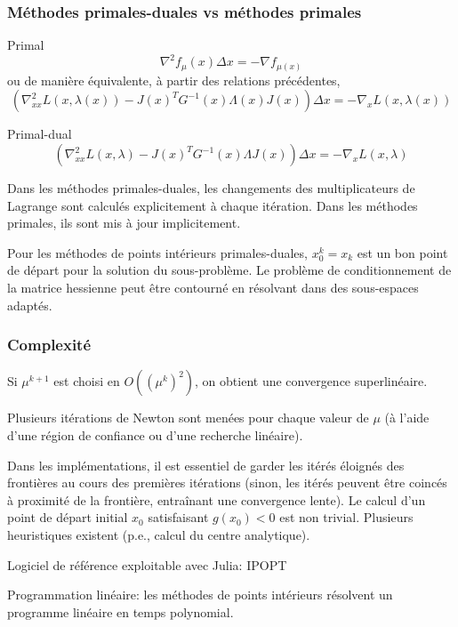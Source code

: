 \documentclass[usepdftitle=false]{beamer}
\def\blue{\color{blue}}
\begin{document}
\begin{frame}
\frametitle{Méthodes primales-duales vs méthodes primales}

{\blue Primal}
$$
\nabla^2 f_{\mu}(x)\Delta x = -\nabla f_{\mu(x)}
$$
ou de manière équivalente, à partir des relations précédentes,
$$
( \nabla^2_{xx} L(x,\lambda(x)) - J(x)^TG^{-1}(x) \Lambda(x) J(x)) \Delta x
 = -\nabla_x L(x,\lambda(x))
$$

{\blue Primal-dual}
$$
( \nabla^2_{xx} L(x, \lambda) - J(x)^TG^{-1}(x) \Lambda J(x)) \Delta x =  -\nabla_x L(x,\lambda)
$$

Dans les méthodes primales-duales, les changements des multiplicateurs de Lagrange sont calculés explicitement à chaque itération.
Dans les méthodes primales, ils sont mis à jour implicitement.

\mbox{}

Pour les méthodes de points intérieurs primales-duales, $x_0^k = x_k$ est un bon point de départ pour la solution du sous-problème.
Le problème de conditionnement de la matrice hessienne peut être contourné en résolvant dans des sous-espaces adaptés.

\end{frame}

\begin{frame}
\frametitle{Complexité}

Si $\mu^{k+1}$ est choisi en $O((\mu^k)^2)$, on obtient une convergence superlinéaire.

\mbox{}

Plusieurs itérations de Newton sont menées pour chaque valeur de $\mu$ (à l'aide d'une région de confiance ou d'une recherche linéaire).

\mbox{}

Dans les implémentations, il est essentiel de garder les itérés éloignés des frontières au cours des premières itérations (sinon, les itérés peuvent être coincés à proximité de la frontière, entraînant une convergence lente).
Le calcul d'un point de départ initial $x_0$ satisfaisant $g(x_0) < 0$ est non trivial.
Plusieurs heuristiques existent (p.e., calcul du centre analytique).

\mbox{}

Logiciel de référence exploitable avec Julia: IPOPT

\mbox{}

Programmation linéaire: les méthodes de points intérieurs résolvent un programme linéaire en temps polynomial.

\end{frame}
\end{document}
